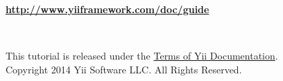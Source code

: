 \begin{titlepage}
    \setlength{\oddsidemargin}{-1in}
    \setlength{\evensidemargin}{-1in}
    \setlength{\textwidth}{\paperwidth}

    \vspace*{\fill}

    \noindent
    \parbox{\textwidth}{\centering \bfseries \Huge
        \formattedTitle
    }

    \vfill

    \noindent
    \parbox{\textwidth}{\centering \bfseries
        \url{http://www.yiiframework.com/doc/guide}
    }

    \vfill

    \noindent
    \parbox{\textwidth}{\centering \Large
        \formattedAuthors
        \\ \vspace{1cm}
        \formattedTranslators
    }

    \vspace*{\fill}

    \noindent
    \parbox{\textwidth}{\centering
        This tutorial is released under the \href{http://www.yiiframework.com/doc/terms/}{Terms of Yii Documentation}.\\
        \vspace{0.5cm}
        Copyright 2014 Yii Software LLC. All Rights Reserved.
    }
\end{titlepage}